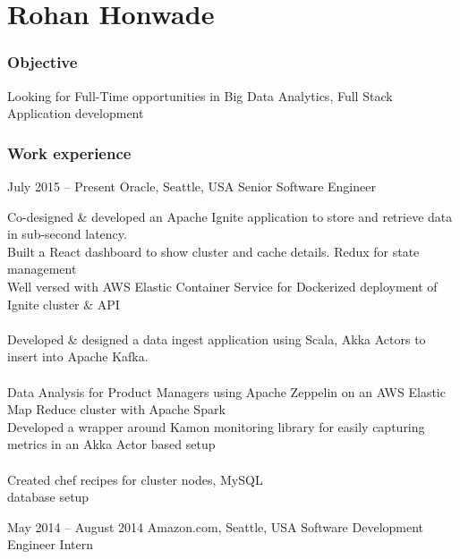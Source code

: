 \documentclass{tccv}
\begin{document}
\part{Rohan Honwade}

\section{Objective}
Looking for Full-Time opportunities in Big Data Analytics, Full Stack Application development

\section{Work experience}
\begin{eventlist}
\item{July 2015 -- Present}
     {Oracle, Seattle, USA}
     {Senior Software Engineer}
     
Co-designed \& developed an Apache Ignite application to store and retrieve data in sub-second latency.\\

Built a React dashboard to show cluster and cache details. Redux for state management\\

Well versed with AWS Elastic Container Service for Dockerized deployment of Ignite cluster \& API\\
\\

Developed \& designed a data ingest application using Scala, Akka Actors to insert into Apache Kafka.\\
\\

Data Analysis for Product Managers using Apache Zeppelin on an AWS Elastic Map Reduce cluster with Apache Spark\\

Developed a wrapper around Kamon monitoring library for easily capturing metrics in an Akka Actor based setup\\
\\

Created chef recipes for cluster nodes, MySQL\\ database setup

\item{May 2014 -- August 2014}
     {Amazon.com, Seattle, USA}
     {Software Development Engineer Intern}


\end{eventlist}
\end{document}
